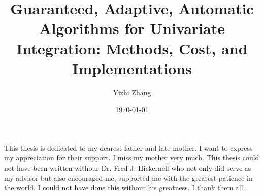 \documentclass{iitthesis}
\theoremstyle{definition}
\theoremstyle{remark}
\begin{document}
\title{Guaranteed, Adaptive, Automatic Algorithms for Univariate Integration: Methods, Cost, and Implementations}
\author{Yizhi Zhang}
\date{\today}
\copyrightnoticefalse      %
\maketitle                %


\prelimpages         %


\begin{acknowledgement}     %
\par  This thesis is dedicated to my dearest father and late mother. I want to express my appreciation for their support. I miss my mother very much. This thesis could not have been written withour Dr. Fred J. Hickernell who not only did serve as my advisor but also encouraged me, supported me with the greatest patience in the world. I could not have done this without his greatness. I thank them all.
\end{acknowledgement}


\tableofcontents
\clearpage

\listoftables

\clearpage

\listoffigures

\clearpage
%
%
%
\end{document}
